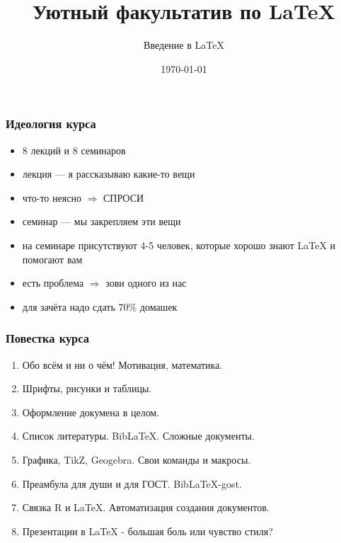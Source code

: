 \documentclass[newPxFont]{beamer}
\title{Уютный факультатив по \LaTeX}
\subtitle{Введение в \LaTeX}
\date{\today}
\begin{document}
\begingroup
{}
\begin{frame}[plain]
\begin{center}
\LARGE{\color{red}{ВНИМАНИЕ!}}
\end{center}
\color{white}{ДАННЫЙ КУРС СОДЕРЖИТ БОЛЬШОЕ КОЛИЧЕСТВО РАЗНООБРАЗНОГО КОДА И ЗАДАНИЙ ДЛЯ САМОСТОЯТЕЛЬНОГО РЕШЕНИЯ.\\ НА ПЕРВЫЙ ВЗГЛЯД ОН МОЖЕТ ПОКАЗАТЬСЯ СЛОЖНЫМ И ТРАВМИРОВАТЬ НЕПОДГОТОВЛЕННУЮ ПСИХИКУ. \\ ТАКЖЕ ОН СОДЕРЖИТ БОЛЬШОЕ КОЛИЧЕСТВО НЕУДАЧНЫХ ШУТОК И НЕУМЕСТНЫХ ОТСЫЛОК. \\ В СВЯЗИ С ЭТИМ КУРС НЕ РЕКОМЕНДУЕТСЯ ПРОСЛУШИВАТЬ \ldots НИКОМУ.}
\end{frame}
\endgroup 

 \maketitle
 
\begin{frame}
\frametitle{Идеология курса}
\begin{itemize}
\item 8 лекций и 8 семинаров 
\item лекция --- я рассказываю какие-то вещи
\item что-то неясно $\Rightarrow$ \alert{СПРОСИ}
\item семинар --- мы закрепляем эти вещи
\item на семинаре присутствуют 4-5 человек, которые хорошо знают \LaTeX{} и помогают вам
\item есть проблема $\Rightarrow$ \alert{зови одного из нас}
\item для зачёта надо сдать 70\% домашек
\end{itemize} 
\end{frame} 


\begin{frame}
\frametitle{Повестка курса}
\begin{enumerate}
\item Обо всём и ни о чём! Мотивация, математика.
\item Шрифты, рисунки и таблицы.
\item Оформление докумена в целом.
\item Список литературы. Bib\LaTeX{}. Сложные документы.
\item Графика, TikZ, Geogebra. Свои команды и макросы.
\item Преамбула для души и для ГОСТ. Bib\LaTeX{-gost}.
\item Связка R и \LaTeX{}. Автоматизация создания документов.
\item Презентации в \LaTeX{} - большая боль или чувство стиля?
\end{enumerate}
\end{frame} 
\end{document}
